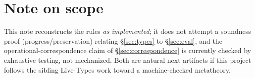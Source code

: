 \documentclass[11pt]{article}
\begin{document}
\section*{Note on scope}

This note reconstructs the rules \emph{as implemented}; it does not attempt
a soundness proof (progress/preservation) relating \S\ref{sec:types} to
\S\ref{sec:eval}, and the operational-correspondence claim of
\S\ref{sec:correspondence} is currently checked by exhaustive testing, not
mechanized. Both are natural next artifacts if this project follows the
sibling Live-Types work toward a machine-checked metatheory.

\end{document}
